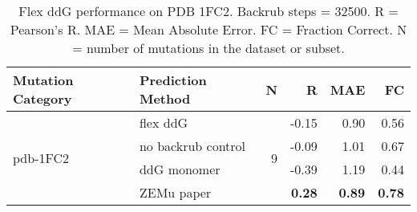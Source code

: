 \begin{table}
  \begin{tabular}{llrrrr}
\toprule
Mutation Category &   Prediction Method &  N &     R &  MAE &   FC \\
\midrule
 \multirow{ 4}{*}{pdb-1FC2} & flex ddG & \multirow{ 4}{*}{9} & -0.15 & 0.90 & 0.56  \\
 & no backrub control & & -0.09 & 1.01 & 0.67  \\
 & ddG monomer & & -0.39 & 1.19 & 0.44  \\
 & ZEMu paper & & \textbf{0.28} & \textbf{0.89} & \textbf{0.78}  \\
\bottomrule
\end{tabular}
  \caption[Flex ddG performance on PDB 1FC2]{
    Flex ddG performance on PDB 1FC2. Backrub steps = 32500. R = Pearson's R. MAE = Mean Absolute Error. FC = Fraction Correct. N = number of mutations in the dataset or subset.
  } \label{tab:table-pdb-1FC2}
\end{table}
